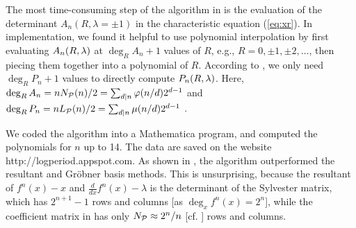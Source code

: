 \documentclass{ws-ijbc}
\begin{document}
The most time-consuming step of the algorithm in 
  is the evaluation of the determinant $A_n(R, \lambda = \pm1)$
  in the characteristic equation (\ref{eq:xr}).
%
In implementation,
we found it helpful to use polynomial interpolation
by first evaluating $A_n(R, \lambda)$ at $\deg_R A_n + 1$ values of $R$,
e.g., $R = 0, \pm1, \pm2,\ldots$, then piecing them together
into a polynomial of $R$.
%
According to , we only need $\deg_R P_n + 1$ values
  to directly compute $P_n(R, \lambda)$.
%
%
Here,
$\deg_R A_n = n N_\mathcal P(n)/2 = \sum_{d|n} \varphi(n/d) 2^{d-1}$
and $\deg_R P_n = n L_\mathcal P(n)/2 = \sum_{d|n} \mu(n/d) 2^{d-1}$
  \cite{mira, stephenson1}.
%
%


We coded the algorithm into a Mathematica program,
  and computed the polynomials for $n$ up to 14.
The data are saved on the website http://logperiod.appspot.com.
%
%
%
%
%
As shown in , the algorithm
  outperformed the resultant \cite{burm} and
  Gr\"obner basis \cite{kk1} methods.
%
This is unsurprising,
  because the resultant of $f^n(x)-x$ and $\frac{d}{dx}f^n(x)-\lambda$
  is the determinant of the Sylvester matrix, which has
  $2^{n+1}-1$ rows and columns
  [as $\deg_x f^n(x) = 2^n$],
  while the coefficient matrix in 
  has only $N_\mathcal P \approx 2^n/n$ [cf. ] rows and columns.
\end{document}
